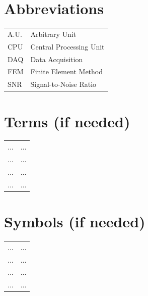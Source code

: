 %


\section*{Abbreviations}  %
\begin{tabular}{p{2cm} p{8cm}}
A.U. & Arbitrary Unit \\
CPU & Central Processing Unit \\
DAQ & Data Acquisition \\
FEM & Finite Element Method \\
SNR & Signal-to-Noise Ratio \\
\end{tabular}

\section*{Terms (if needed)}  %
\begin{tabular}{p{2cm} p{8cm}}
... & ... \\
... & ... \\
... & ... \\
... & ... \\
\end{tabular}


\section*{Symbols (if needed)} %
\begin{tabular}{p{2cm} p{8cm}}
... & ... \\
... & ... \\
... & ... \\
... & ... \\
\end{tabular}


